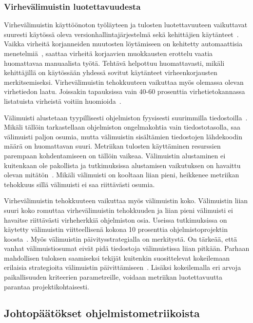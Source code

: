 \documentclass[finnish]{tktltiki2}
\theoremstyle{definition}
\theoremstyle{remark}
\begin{document}
\subsubsection{Virhevälimuistin luotettavuudesta}

Virhevälimuistin käyttöönoton työläyteen ja tulosten luotettavuuteen vaikuttavat suuresti käytössä oleva versionhallintajärjestelmä sekä kehittäjien käytänteet~\cite{SLLZW11}. Vaikka virheitä korjanneiden muutosten löytämiseen on kehitetty automaattisia menetelmiä~\cite{SZZ05, KZKW06}, saattaa virheitä korjaavien muokkausten erottelu vaatia huomattavaa manuaalista työtä. Tehtävä helpottuu huomattavasti, mikäli kehittäjillä on käytössään yhdessä sovitut käytänteet virheenkorjausten merkitsemiseksi. Virhevälimuistin tehokkuuteen vaikuttaa myös olemassa olevan virhetiedon laatu. Joissakin tapauksissa vain 40-60 prosenttia virhetietokannassa listatuista virheistä voitiin huomioida~\cite{KZWZ07}.

Välimuisti alustetaan tyypillisesti ohjelmiston fyysisesti suurimmilla tiedostoilla~\cite{KZWZ07}. Mikäli tällöin tarkastellaan ohjelmiston ongelmakohtia vain tiedostotasolla, saa välimuisti paljon osumia, mutta välimuistin sisältämien tiedostojen lähdekoodin määrä on huomattavan suuri. Metriikan tulosten käyttäminen resurssien parempaan kohdentamiseen on tällöin vaikeaa. Välimuistin alustaminen ei kuitenkaan ole pakollista ja tutkimuksissa alustamisen vaikutuksen on havaittu olevan mitätön~\cite{WFGWW09}. Mikäli välimuisti on kooltaan liian pieni, heikkenee metriikan tehokkuus sillä välimuisti ei saa riittävästi osumia.

Virhevälimuistin tehokkuuteen vaikuttaa myös välimuistin koko. Välimuistin liian suuri koko romuttaa virhevälimuistin tehokkuuden ja liian pieni välimuisti ei havaitse riittävästi virheherkkiä ohjelmiston osia. Useissa tutkimuksissa on käytetty välimuistin viitteellisenä kokona 10 prosenttia ohjelmistoprojektin koosta~\cite{SLLZW11, KZWZ07}. Myös välimuistin päivitysstrategialla on merkitystä. On tärkeää, että vanhat välimuistiosumat eivät pidä tiedostoja välimuistissa liian pitkään. Parhaan mahdollisen tuloksen saamiseksi tekijät kuitenkin suosittelevat kokeilemaan erilaisia strategioita välimuistin päivittämiseen~\cite{}. Lisäksi kokeilemalla eri arvoja paikallisuuden kriteerien parametreille, voidaan metriikan luotettavuutta parantaa projektikohtaisesti.

\subsection{Johtopäätökset ohjelmistometriikoista}
\end{document}
